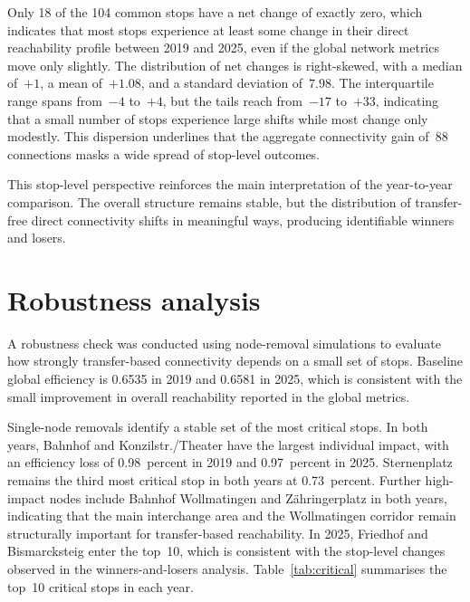 \documentclass[12pt,a4paper,oneside]{report}
\begin{document}
Only 18 of the 104 common stops have a net change of exactly zero, which indicates that most stops experience at least some change in their direct reachability profile between 2019 and 2025, even if the global network metrics move only slightly.
The distribution of net changes is right-skewed, with a median of~$+1$, a mean of~$+1.08$, and a standard deviation of~$7.98$.
The interquartile range spans from~$-4$ to~$+4$, but the tails reach from~$-17$ to~$+33$, indicating that a small number of stops experience large shifts while most change only modestly.
This dispersion underlines that the aggregate connectivity gain of~88 connections masks a wide spread of stop-level outcomes.

This stop-level perspective reinforces the main interpretation of the year-to-year comparison.
The overall structure remains stable, but the distribution of transfer-free direct connectivity shifts in meaningful ways, producing identifiable winners and losers.

\section{Robustness analysis}\label{sec:robustness-results}

A robustness check was conducted using node-removal simulations to evaluate how strongly transfer-based connectivity depends on a small set of stops.
Baseline global efficiency is 0.6535 in 2019 and 0.6581 in 2025, which is consistent with the small improvement in overall reachability reported in the global metrics.

Single-node removals identify a stable set of the most critical stops.
In both years, Bahnhof and Konzilstr./Theater have the largest individual impact, with an efficiency loss of 0.98~percent in 2019 and 0.97~percent in 2025.
Sternenplatz remains the third most critical stop in both years at 0.73~percent.
Further high-impact nodes include Bahnhof Wollmatingen and Z\"{a}hringerplatz in both years, indicating that the main interchange area and the Wollmatingen corridor remain structurally important for transfer-based reachability.
In 2025, Friedhof and Bismarcksteig enter the top~10, which is consistent with the stop-level changes observed in the winners-and-losers analysis.
Table~\ref{tab:critical} summarises the top~10 critical stops in each year.
\end{document}
